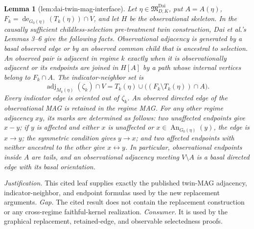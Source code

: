 \documentclass{article}
\newtheorem{lemma}{Lemma}
\begin{document}
\begin{lemma}[lem:dai-twin-mag-interface]\label{lem:dai-twin-mag-interface}
Let \(\eta\in\mathfrak M_{D,K}^{\mathrm{Dai}}\), put \(A=A(\eta)\), \(F_k=\operatorname{de}_{G_0(\eta)}(T_k(\eta))\cap V\), and let \(H\) be the observational skeleton.  In the causally sufficient childless-selection pre-treatment twin construction, Dai et al.'s Lemmas 3--6 give the following facts.  Observational adjacency is generated by a basal observed edge or by an observed common child that is ancestral to selection.  An observed pair is adjacent in regime \(k\) exactly when it is observationally adjacent or its endpoints are joined in \(H[A]\) by a path whose internal vertices belong to \(F_k\cap A\).  The indicator-neighbor set is
\[
\operatorname{adj}_{M_k(\eta)}(\zeta_k)\cap V
=T_k(\eta)\cup\bigl((F_k\setminus T_k(\eta))\cap A\bigr).
\]
Every indicator edge is oriented out of \(\zeta_k\).  An observed directed edge of the observational MAG is retained in the regime MAG.  For any other regime adjacency \(xy\), its marks are determined as follows: two unaffected endpoints give \(x\mathbin{-}y\); if \(y\) is affected and either \(x\) is unaffected or \(x\in\operatorname{An}_{G_0(\eta)}(y)\), the edge is \(x\to y\); the symmetric condition gives \(y\to x\); and two affected endpoints with neither ancestral to the other give \(x\leftrightarrow y\).  In particular, observational endpoints inside \(A\) are tails, and an observational adjacency meeting \(V\setminus A\) is a basal directed edge with its basal orientation.
\end{lemma}
\par\smallskip\noindent \textit{Justification.} This cited leaf supplies exactly the published twin-MAG adjacency, indicator-neighbor, and endpoint formulas used by the new replacement arguments. \textit{Gap.} The cited result does not contain the replacement construction or any cross-regime faithful-kernel realization. \textit{Consumer.} It is used by the graphical replacement, retained-edge, and observable selectedness proofs.
\end{document}
